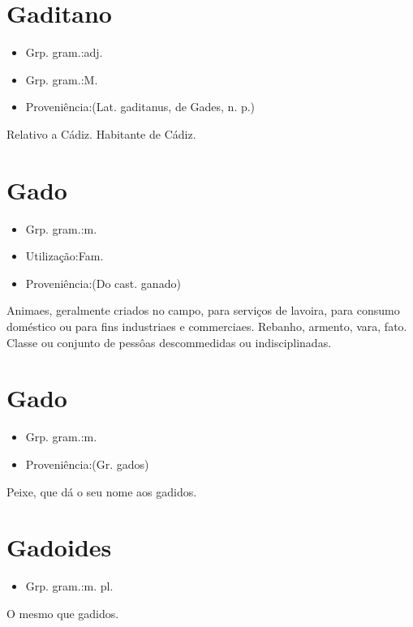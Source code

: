 \section{Gaditano}
\begin{itemize}
\item {Grp. gram.:adj.}
\end{itemize}
\begin{itemize}
\item {Grp. gram.:M.}
\end{itemize}
\begin{itemize}
\item {Proveniência:(Lat. \textunderscore gaditanus\textunderscore , de \textunderscore Gades\textunderscore , n. p.)}
\end{itemize}
Relativo a Cádiz.
Habitante de Cádiz.
\section{Gado}
\begin{itemize}
\item {Grp. gram.:m.}
\end{itemize}
\begin{itemize}
\item {Utilização:Fam.}
\end{itemize}
\begin{itemize}
\item {Proveniência:(Do cast. \textunderscore ganado\textunderscore )}
\end{itemize}
Animaes, geralmente criados no campo, para serviços de lavoira, para consumo doméstico ou para fins industriaes e commerciaes.
Rebanho, armento, vara, fato.
Classe ou conjunto de pessôas descommedidas ou indisciplinadas.
\section{Gado}
\begin{itemize}
\item {Grp. gram.:m.}
\end{itemize}
\begin{itemize}
\item {Proveniência:(Gr. \textunderscore gados\textunderscore )}
\end{itemize}
Peixe, que dá o seu nome aos gadidos.
\section{Gadoides}
\begin{itemize}
\item {Grp. gram.:m. pl.}
\end{itemize}
O mesmo que \textunderscore gadidos\textunderscore .
